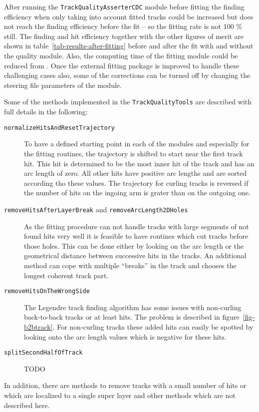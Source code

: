 After running the \texttt{Track\-Quality\-Asserter\-CDC} module before fitting the finding efficiency when only taking into account fitted tracks could be increased but does not reach the finding efficiency before the fit -- so the fitting rate is not 100 \% still. The finding and hit efficiency together with the other figures of merit are shown in table~\ref{tab-results-after-fitting} before and after the fit with and without the quality module. Also, the computing time of the fitting module could be reduced from . Once the external fitting package is improved to handle these challenging cases also, some of the corrections can be turned off by changing the steering file parameters of the module.

\begin{table}
  \caption{}
  \label{tab-results-after-fitting}
\end{table}

Some of the methods implemented in the \texttt{TrackQualityTools} are described with full details in the following:
\begin{description}
 \item[\texttt{normalizeHitsAndResetTrajectory}] To have a defined starting point in each of the modules and especially for the fitting routines, the trajectory is shifted to start near the first track hit. This hit is determined to be the most inner hit of the track and has an arc length of zero. All other hits have positive arc lengths and are sorted according tho these values. The trajectory for curling tracks is reversed if the number of hits on the ingoing arm is grater than on the outgoing one.
 \item[\texttt{removeHitsAfterLayerBreak} and \texttt{removeArcLength2DHoles}]  As the fitting procedure can not handle tracks with large segments of not found hits very well it is feasible to have routines which cut tracks before those holes. This can be done either by looking on the arc length or the geometrical distance between successive hits in the tracks. An additional method can cope with multiple ``breaks'' in the track and chooses the longest coherent track part.
 \item[\texttt{removeHitsOnTheWrongSide}] The Legendre track finding algorithm has some issues with non-curling back-to-back tracks or at least hits. The problem is described in figure~\ref{fig-b2btrack}. For non-curling tracks these added hits can easily be spotted by looking onto the arc length values which is negative for these hits.
 \item[\texttt{splitSecondHalfOfTrack}] TODO
\end{description}
In addition, there are methods to remove tracks with a small number of hits or which are localized to a single super layer and other methods which are not described here.

